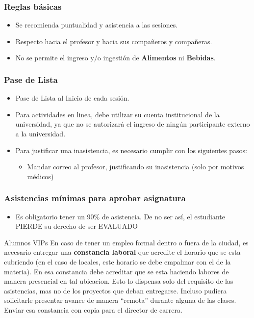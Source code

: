 
\begin{frame}
\frametitle{Reglas básicas}
\begin{itemize}
\item Se recomienda puntualidad y asistencia a las sesiones.
\item Respecto hacia el profesor y hacia sus compañeros y compañeras.  
\item No se permite el ingreso y/o ingestión de \textbf{Alimentos} ni \textbf{Bebidas}. 
\end{itemize}
\end{frame}

\begin{frame}
\frametitle{Pase de Lista}
\begin{itemize}
\item Pase de Lista al Inicio de cada sesi\'on.
\item Para actividades en linea, debe utilizar su cuenta institucional de la universidad, ya que no se autorizará el ingreso de ningún participante externo a la universidad.  
\item Para justificar una inasistencia, es necesario cumplir con los siguientes pasos:
\begin{itemize}	 
\item Mandar correo al profesor, justificando su inasistencia (solo por motivos m\'edicos)
\end{itemize}
\end{itemize}
\end{frame}


\begin{frame}
\frametitle{Asistencias m\'inimas para aprobar asignatura}
\begin{itemize}
\item Es obligatorio tener un 90\% de asistencia. De no ser as\'i, el estudiante PIERDE su derecho de ser EVALUADO
\end{itemize}
\begin{block}{Alumnos VIPs}
En caso de tener un empleo formal dentro o fuera de la ciudad, es necesario entregar una \textbf{constancia laboral} que acredite el horario que se esta cubriendo (en el caso de locales, este horario se debe empalmar con el de la materia). En esa constancia debe acreditar que se esta haciendo labores de manera presencial en tal ubicacion. Esto lo dispensa solo del requisito de las asistencias, mas no de los proyectos que deban entregarse. Incluso pudiera solicitarle presentar avance de manera ``remota'' durante alguna de las clases. Enviar esa constancia con copia para el director de carrera.
\end{block}
\end{frame}

